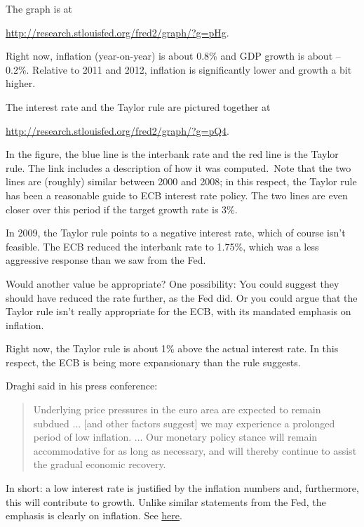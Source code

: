 \documentclass[12pt]{exam}
\begin{document}
\begin{questions}
\begin{solution}
\begin{parts}
\item The graph is at

\url{http://research.stlouisfed.org/fred2/graph/?g=pHg}.

Right now, inflation (year-on-year) is about 0.8\% and GDP growth is about --0.2\%.
Relative to 2011 and 2012, inflation is significantly lower and growth a bit higher.

\item The interest rate and the Taylor rule are pictured together at

\url{http://research.stlouisfed.org/fred2/graph/?g=pQ4}.

In the figure, the blue line is the interbank rate and
the red line is the Taylor rule.
The link includes a description of how it was computed.\
Note that the two lines are (roughly) similar between 2000 and 2008; in this respect,
the Taylor rule has been a reasonable guide to ECB interest rate policy.
The two lines are even closer over this period if the target 
growth rate is 3\%.  

\item In 2009, the Taylor rule points to a negative interest rate,
which of course isn't feasible.
The ECB reduced the interbank rate to 1.75\%,
which was a less aggressive response than we saw from the Fed.

Would another value be appropriate?
One possibility:
You could suggest they should have reduced the rate further,
as the Fed did.
Or you could argue that the Taylor rule isn't really appropriate for the ECB,
with its mandated emphasis on inflation.

\item Right now, the Taylor rule is about 1\% above the actual interest rate.
In this respect, the ECB is being more expansionary than the rule suggests. 

Draghi said in his press conference:
\begin{quote}
Underlying price pressures in the euro area are expected to remain subdued ...
[and other factors suggest] we may experience a prolonged period of low inflation.  ...
Our monetary policy stance will remain accommodative for as long as necessary,
and will thereby continue to assist the gradual economic recovery.
\end{quote}
In short:  a low interest rate is justified by the inflation numbers and, furthermore,
this will contribute to growth.
Unlike similar statements from the Fed, the emphasis is clearly on inflation.
See
\href{http://www.ecb.europa.eu/press/pressconf/2013/html/is131205.en.html}{here}.


\end{parts}
\end{solution}
\end{questions}
\end{document}
